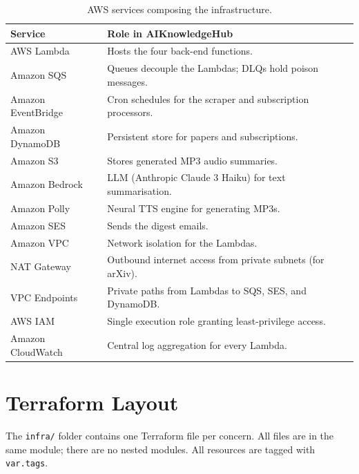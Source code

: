 \documentclass[11pt,a4paper]{article}
\begin{document}
\begin{table}[h]
\centering
\begin{tabularx}{\linewidth}{lX}
\toprule
\textbf{Service} & \textbf{Role in AIKnowledgeHub} \\
\midrule
AWS Lambda          & Hosts the four back-end functions. \\
Amazon SQS          & Queues decouple the Lambdas; DLQs hold poison messages. \\
Amazon EventBridge  & Cron schedules for the scraper and subscription processors. \\
Amazon DynamoDB     & Persistent store for papers and subscriptions. \\
Amazon S3           & Stores generated MP3 audio summaries. \\
Amazon Bedrock      & LLM (Anthropic Claude 3 Haiku) for text summarisation. \\
Amazon Polly        & Neural TTS engine for generating MP3s. \\
Amazon SES          & Sends the digest emails. \\
Amazon VPC          & Network isolation for the Lambdas. \\
NAT Gateway         & Outbound internet access from private subnets (for arXiv). \\
VPC Endpoints       & Private paths from Lambdas to SQS, SES, and DynamoDB. \\
AWS IAM             & Single execution role granting least-privilege access. \\
Amazon CloudWatch   & Central log aggregation for every Lambda. \\
\bottomrule
\end{tabularx}
\caption{AWS services composing the infrastructure.}
\end{table}

\section{Terraform Layout}

The \texttt{infra/} folder contains one Terraform file per concern. All files are in the same module; there are no nested modules. All resources are tagged with \texttt{var.tags}.
\end{document}
